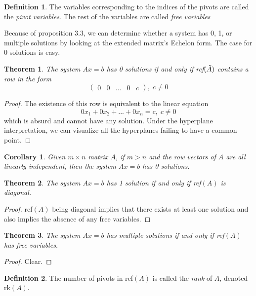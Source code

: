 \documentclass{article}
\newtheorem{theorem}{Theorem}[section]
\newtheorem{corollary}{Corollary}[theorem]
\theoremstyle{remark}
\theoremstyle{definition}
\newtheorem{definition}{Definition}[section]
\begin{document}
\begin{definition}
The variables corresponding to the indices of the pivots are called the \textit{pivot variables}. The rest of the variables are called \textit{free variables}
\end{definition}

Because of proposition 3.3, we can determine whether a system has 0, 1, or multiple solutions by looking at the extended matrix's Echelon form. The case for 0 solutions is easy. 

\begin{theorem}
The system $A x = b$ has 0 solutions if and only if ref$(\Tilde{A})$ contains a row in the form 
\[ \begin{pmatrix}
0 & 0 & ... & 0 & c
\end{pmatrix}, \; c \neq 0\]
\end{theorem}

\begin{proof}
The existence of this row is equivalent to the linear equation
\[ 0 x_1 + 0 x_2 + ... + 0 x_n = c, \; c \neq 0\]
which is absurd and cannot have any solution. Under the hyperplane interpretation, we can visualize all the hyperplanes failing to have a common point. 
\end{proof}

\begin{corollary}
Given $m \times n$ matrix $A$, if $m > n$ and the row vectors of $A$ are all linearly independent, then the system $A x = b$ has 0 solutions. 
\end{corollary}

\begin{theorem}
The system $A x = b$ has 1 solution if and only if ref$(A)$ is diagonal. 
\end{theorem}

\begin{proof}
ref$(A)$ being diagonal implies that there exists at least one solution and also implies the absence of any free variables. 
\end{proof}

\begin{theorem}
The system $A x = b$ has multiple solutions if and only if ref$(A)$ has free variables. 
\end{theorem}
\begin{proof}
Clear. 
\end{proof}

\begin{definition}
The number of pivots in ref$(A)$ is called the \textit{rank} of $A$, denoted rk$(A)$. 
\end{definition}
\end{document}

